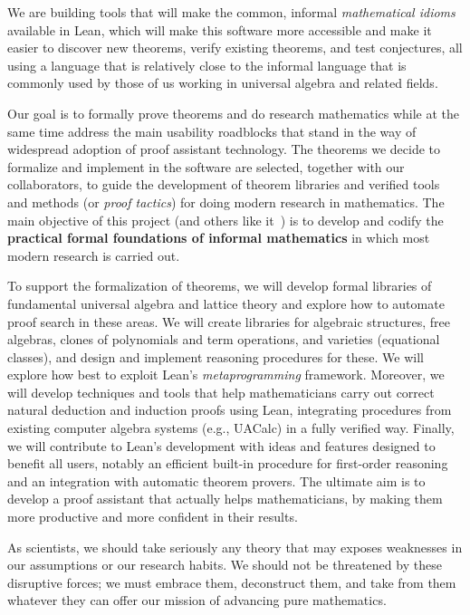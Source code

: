 \documentclass[11pt]{amsart}  %
\begin{document}
We are building tools that will make the common, informal \emph{mathematical idioms} available in Lean, which will make this software more accessible and make it easier to discover new theorems, verify existing theorems, and test conjectures, all using a language that is relatively close to the informal language that is commonly used by those of us working in universal algebra and related fields.

Our goal is to formally prove theorems and do research mathematics while at the same time address the main usability roadblocks that stand in the way of widespread adoption of proof assistant technology.  The theorems we decide to formalize and implement in the software are selected, together with our collaborators, to guide the development of theorem libraries and verified tools and methods (or \emph{proof tactics}) for doing modern research in mathematics.  The main objective of this project (and others like it~\cite{lean-mathlib:2018,blanchette:2018}) is to develop and codify the \textbf{practical formal foundations of informal mathematics} in which most modern research is carried out.

To support the formalization of theorems, we will develop formal libraries of fundamental universal algebra and lattice theory and explore how to automate proof search in these areas. We will create libraries for algebraic structures, free algebras, clones of polynomials and term operations, and varieties (equational classes), and design and implement reasoning procedures for these. We will explore how best to exploit Lean's \emph{metaprogramming} framework. Moreover, we will develop techniques and tools that help mathematicians carry out correct natural deduction and induction proofs using Lean, integrating procedures from existing computer algebra systems (e.g., UACalc) in a fully verified way. Finally, we will contribute to Lean's development with ideas and features designed to benefit all users, notably an efficient built-in procedure for first-order reasoning and an integration with automatic theorem provers. The ultimate aim is to develop a proof assistant that actually helps mathematicians, by making them more productive and more confident in their results.

As scientists, we should take seriously any theory that may exposes weaknesses in our assumptions or our research habits.  We should not be threatened by these disruptive forces; we must embrace them, deconstruct them, and take from them whatever they can offer our mission of advancing pure mathematics.
\end{document}
